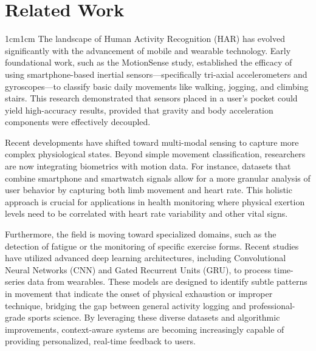 \documentclass[11pt,a4paper]{article}
\begin{document}
\section{Related Work}
\begin{adjustwidth}{1cm}{1cm}
The landscape of Human Activity Recognition (HAR) has evolved significantly with the advancement of mobile and wearable technology. Early foundational work, such as the MotionSense study, established the efficacy of using smartphone-based inertial sensors—specifically tri-axial accelerometers and gyroscopes—to classify basic daily movements like walking, jogging, and climbing stairs. This research demonstrated that sensors placed in a user's pocket could yield high-accuracy results, provided that gravity and body acceleration components were effectively decoupled.

Recent developments have shifted toward multi-modal sensing to capture more complex physiological states. Beyond simple movement classification, researchers are now integrating biometrics with motion data. For instance, datasets that combine smartphone and smartwatch signals allow for a more granular analysis of user behavior by capturing both limb movement and heart rate. This holistic approach is crucial for applications in health monitoring where physical exertion levels need to be correlated with heart rate variability and other vital signs.

Furthermore, the field is moving toward specialized domains, such as the detection of fatigue or the monitoring of specific exercise forms. Recent studies have utilized advanced deep learning architectures, including Convolutional Neural Networks (CNN) and Gated Recurrent Units (GRU), to process time-series data from wearables. These models are designed to identify subtle patterns in movement that indicate the onset of physical exhaustion or improper technique, bridging the gap between general activity logging and professional-grade sports science. By leveraging these diverse datasets and algorithmic improvements, context-aware systems are becoming increasingly capable of providing personalized, real-time feedback to users.
\end{adjustwidth}
\end{document}
